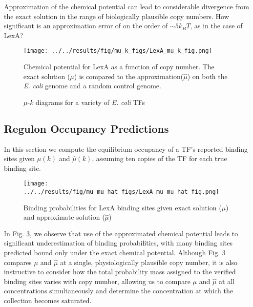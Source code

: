 \documentclass{article}
\begin{document}
Approximation of the chemical potential can lead to considerable
divergence from the exact solution in the range of biologically
plausible copy numbers.  How significant is an approximation error of
on the order of $\sim 5k_BT$, as in the case of LexA?


\begin{figure}[ht]
  \centering
  \texttt{[image: ../../results/fig/mu\_k\_figs/LexA\_mu\_k\_fig.png]}
  \caption{Chemical potential for LexA as a function of copy number.
    The exact solution ($\mu$) is compared to the approximation($\hat\mu$) on both the
    \textit{E. coli} genome and a random control genome.}
  \label{fig:LexA_mu_vs_k}
\end{figure}



\begin{figure}[ht]
  \centering
  \caption{$\mu$-$k$ diagrams for a variety of \textit{E. coli} TFs}
  \label{fig:mu_vs_k_examples}
\end{figure}

\subsection{Regulon Occupancy Predictions}
In this section we compute the equilibrium occupancy of a TF's
reported binding sites given $\mu(k)$ and $\hat\mu(k)$, assuming ten
copies of the TF for each true binding site.

  \begin{figure}[ht]
    \centering
\texttt{[image: ../../results/fig/mu\_mu\_hat\_figs/LexA\_mu\_mu\_hat\_fig.png]}
    \caption{Binding probabilities for LexA binding sites given exact solution ($\mu$) and approximate solution ($\hat\mu$)}
    \label{fig:LexA_site_killing_exp}
  \end{figure}

  In Fig. \ref{fig:LexA_site_killing_exp}, we observe that use of the
  approximated chemical potential leads to significant underestimation
  of binding probabilities, with many binding sites predicted bound
  only under the exact chemical potential.  Although
  Fig. \ref{fig:LexA_site_killing_exp} compares $\mu$ and $\hat\mu$ at
  a single, physiologically plausible copy number, it is also
  instructive to consider how the total probability mass assigned to
  the verified binding sites varies with copy number, allowing us to
  compare $\mu$ and $\hat\mu$ at all concentrations simultaneously and
  determine the concentration at which the collection becomes saturated.
\end{document}

